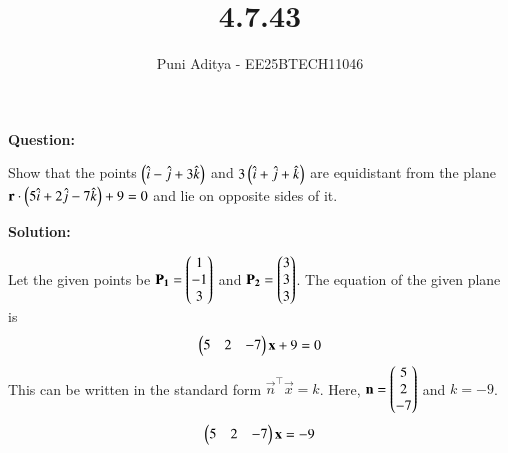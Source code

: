 \documentclass[journal]{IEEEtran}
\begin{document}
\title{4.7.43}
\author{Puni Aditya - EE25BTECH11046}
\maketitle

\textbf{Question:}

Show that the points $\left(\hat{i}-\hat{j}+3\hat{k}\right)$ and $3\left(\hat{i}+\hat{j}+\hat{k}\right)$ are equidistant from the plane $\mathbf{r}\cdot\left(5\hat{i}+2\hat{j}-7\hat{k}\right) + 9 = 0$ and lie on opposite sides of it.

\textbf{Solution:}

Let the given points be $\mathbf{P_1} = \begin{pmatrix}1 \\ -1 \\ 3\end{pmatrix}$ and $\mathbf{P_2} = \begin{pmatrix}3 \\ 3 \\ 3\end{pmatrix}$.
The equation of the given plane is
\begin{align}
    \begin{pmatrix}5 & 2 & -7\end{pmatrix}\mathbf{x} + 9 = 0
\end{align}
This can be written in the standard form $\vec{n}^\top\vec{x} = k$. Here, $\mathbf{n} = \begin{pmatrix}5 \\ 2 \\ -7\end{pmatrix}$ and $k = -9$.
\begin{align}
    \begin{pmatrix}5 & 2 & -7\end{pmatrix}\mathbf{x} = -9 \label{eq:plane_eqn}
\end{align}
\end{document}

